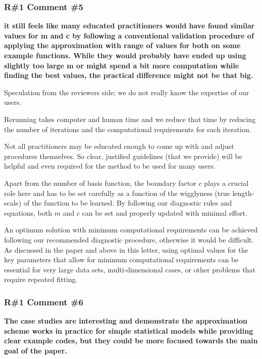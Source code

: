 \documentclass[11pt]{report}
\begin{document}
\subsubsection*{R\#1 Comment \#5}

\textbf{it still feels like many educated practitioners would have found similar values for m and c by following a conventional validation procedure of applying the approximation with range of values for both on some example functions. While they would probably have ended up using slightly too large m or might spend a bit more computation while finding the best values, the practical difference might not be that big.}

Speculation from the reviewers side; we do not really know the expertise of our users. 

Rerunning takes computer and human time and we reduce that time by reducing the number of iterations and the computational requirements for each iteration. 

Not all practitioners may be educated enough to come up with and adjust procedures themselves. So clear, justified guidelines (that we provide) will be helpful and even required for the method to be used for many users.

Apart from the number of basis function, the boundary factor $c$ plays a crucial role here and has to be set carefully as a function of the wigglyness (true length-scale) of the function to be learned. By following our diagnostic rules and equations, both $m$ and $c$ can be set and properly updated with minimal effort.

An optimum solution with minimum computational requirements can be achieved following our recommended diagnostic procedure, otherwise it would be difficult. As discussed in the paper and above in this letter, using optimal values for the key parameters that allow for minimum computational requirements can be essential for very large data sets, multi-dimensional cases, or other problems that require repeated fitting.

\subsubsection*{R\#1 Comment \#6}

\textbf{The case studies are interesting and demonstrate the approximation scheme works in practice for simple statistical models while providing clear example codes, but they could be more focused towards the main goal of the paper.}
\end{document}
